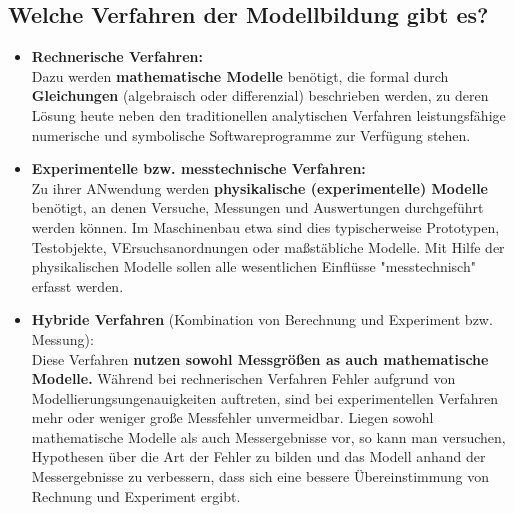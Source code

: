 \subsection{Welche Verfahren der Modellbildung gibt es?}
\begin{itemize}
    \item \textbf{Rechnerische Verfahren:}\\
    Dazu werden \textbf{mathematische Modelle} benötigt, die formal durch \textbf{Gleichungen} (algebraisch oder differenzial)
    beschrieben werden, zu deren Lösung heute neben den traditionellen analytischen Verfahren leistungsfähige numerische und 
    symbolische Softwareprogramme zur Verfügung stehen.
    \item \textbf{Experimentelle bzw. messtechnische Verfahren:}\\
    Zu ihrer ANwendung werden \textbf{physikalische (experimentelle) Modelle} benötigt, an denen Versuche, Messungen und Auswertungen
    durchgeführt werden können. Im Maschinenbau etwa sind dies typischerweise Prototypen, Testobjekte, VErsuchsanordnungen oder
    maßstäbliche Modelle. Mit Hilfe der physikalischen Modelle sollen alle wesentlichen Einflüsse "messtechnisch" erfasst werden.
    \item \textbf{Hybride Verfahren} (Kombination von Berechnung und Experiment bzw. Messung):\\
    Diese Verfahren \textbf{nutzen sowohl Messgrößen as auch mathematische Modelle.} Während bei rechnerischen Verfahren Fehler aufgrund
    von Modellierungsungenauigkeiten auftreten, sind bei experimentellen Verfahren mehr oder weniger große Messfehler unvermeidbar.
    Liegen sowohl mathematische Modelle als auch Messergebnisse vor, so kann man versuchen, Hypothesen über die Art der Fehler 
    zu bilden und das Modell anhand der Messergebnisse zu verbessern, dass sich eine bessere Übereinstimmung von Rechnung und 
    Experiment ergibt.
\end{itemize}

